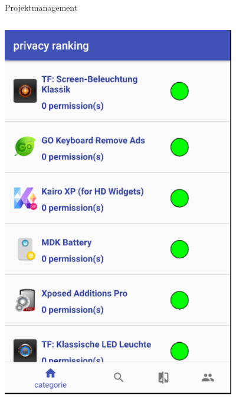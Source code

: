 \documentclass[compress,t]{beamer}
\begin{document}
\begin{frame}{Projektmanagement}
\begin{columns}[t]
        \includegraphics[width=0.8\textwidth]{img/4.png}
    \end{columns}

\end{frame}
\end{document}
